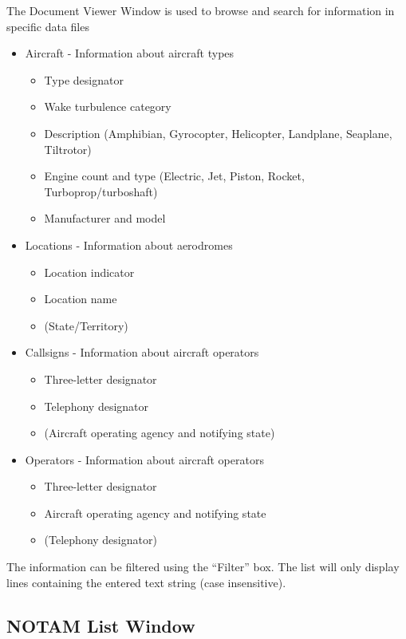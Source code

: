 \documentclass[11pt,a4paper,oldfontcommands]{memoir}
\begin{document}
The Document Viewer Window is used to browse and search for information in specific data files

\begin{itemize}
    \item Aircraft - Information about aircraft types
    \begin{itemize}
        \item Type designator
        \item Wake turbulence category
        \item Description (Amphibian, Gyrocopter, Helicopter, Landplane, Seaplane, Tiltrotor)
        \item Engine count and type (Electric, Jet, Piston, Rocket, Turboprop/turboshaft)
        \item Manufacturer and model
    \end{itemize}
    \item Locations - Information about aerodromes
    \begin{itemize}
        \item Location indicator
        \item Location name
        \item (State/Territory)
    \end{itemize}
    \item Callsigns - Information about aircraft operators
    \begin{itemize}
        \item Three-letter designator
        \item Telephony designator
        \item (Aircraft operating agency and notifying state)
    \end{itemize}   
    \item Operators - Information about aircraft operators
    \begin{itemize}
        \item Three-letter designator
        \item Aircraft operating agency and notifying state
        \item (Telephony designator)
    \end{itemize}
\end{itemize}

The information can be filtered using the “Filter” box. The list will only display lines containing the entered text string (case insensitive).

\subsection{NOTAM List Window}
\label{win:notamlw}
\end{document}
